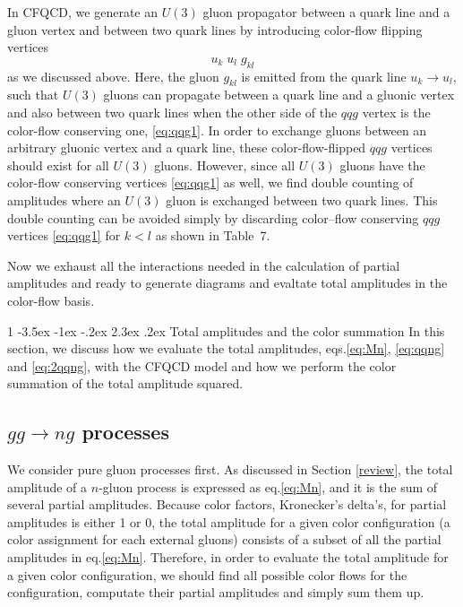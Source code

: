 \documentclass[a4paper,11pt]{article}
\makeatletter
\renewcommand{\section}{%
  \@startsection{section}%
   {1}%
   {\z@}%
   {-3.5ex \@plus -1ex \@minus -.2ex}%
   {2.3ex \@plus.2ex}%
   {\normalfont\large\bfseries}%
}%
\makeatother
\begin{document}
In CFQCD, we generate an $U(3)$ gluon propagator between a quark line and
a gluon vertex and between two quark lines by introducing color-flow
flipping vertices
\begin{equation}
 u_k\; u_l\; g_{kl}
  \label{eq:interaction2}
\end{equation}
as we discussed above. Here, the gluon $g_{kl}$ is emitted from the quark line
 $u_k\rightarrow u_l$, such that $U(3)$ gluons can propagate
 between a quark line and a gluonic vertex and also between
 two quark lines when the other side of the $qqg$ vertex is the
 color-flow conserving one, \eqref{eq:qqg1}. In order to exchange gluons between an arbitrary gluonic vertex and a quark line, these color-flow-flipped $qqg$ vertices should exist for all $U(3)$ gluons. However, since all $U(3)$ gluons have the color-flow conserving vertices \eqref{eq:qqg1} as well, we find double counting of amplitudes where an $U(3)$ gluon is exchanged between two quark lines. This double counting can be avoided simply by discarding color--flow conserving $qqg$ vertices \eqref{eq:qqg1} for $k<l$ as shown in Table~7. 

Now we exhaust all the interactions needed in
the calculation of partial amplitudes and ready to generate diagrams and evaltate total
amplitudes in the color-flow
basis.

\section{Total amplitudes and the color summation}
In this section, we discuss how we evaluate the total amplitudes,
eqs.\eqref{eq:Mn}, \eqref{eq:qqng} and \eqref{eq:2qqng}, with the
CFQCD model and how we perform the color summation of the total
amplitude squared.

\subsection{$gg\rightarrow ng$ processes}
 We consider pure gluon processes first. As discussed in Section
\ref{review}, the total amplitude of a $n$-gluon process is expressed as
eq.\eqref{eq:Mn}, and it is the sum of several partial
amplitudes. Because color factors, Kronecker's delta's, for partial
amplitudes is either 1 or 0, the total amplitude for a given color
configuration (a color assignment for each external gluons) consists of a subset of all the partial amplitudes in
eq.\eqref{eq:Mn}.  Therefore, in order to evaluate the total amplitude for a given
color configuration, we should find all possible color flows for the
configuration, computate their partial amplitudes and simply sum
them up.
\end{document}
